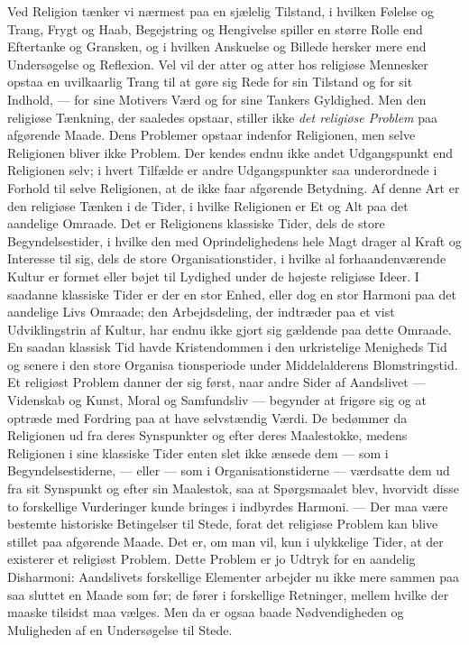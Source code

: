 \documentclass[12pt,a4paper,openany]{book}
\newcommand{\opage}[1]{\marginnote{\footnotesize\textit{[#1]}}}
\begin{document}
Ved Religion tænker vi nærmest paa en sjælelig Tilstand, i hvilken
Følelse og Trang, Frygt og Haab, Begejstring og Hengivelse spiller en
større Rolle end Eftertanke og Gransken, og i hvilken Anskuelse og
Billede hersker mere end Undersøgelse og Reflexion. Vel vil der atter og
atter hos religiøse Mennesker opstaa en uvilkaarlig Trang til at gøre
sig Rede for sin Tilstand og for sit Indhold, --- for sine Motivers Værd
og for sine Tankers Gyldighed. Men den religiøse Tænkning, der saaledes
opstaar, stiller ikke \textit{det religiøse Problem} paa afgørende
Maade. Dens Problemer opstaar indenfor Religionen, men selve Religionen
bliver ikke Problem. Der kendes endnu ikke andet Udgangspunkt end
Religionen selv; i hvert Tilfælde er andre Udgangspunkter saa
underordnede i Forhold til selve Religionen, at de ikke faar afgørende
Betydning. Af denne Art er den religiøse Tænken i de Tider, i hvilke
Religionen er Et og Alt paa det aandelige Omraade. Det er Religionens
klassiske Tider, dels de store Begyndelsestider, i hvilke den med
Oprindelighedens hele Magt drager al Kraft og Interesse til sig, dels de
store Organisationstider, i hvilke al forhaandenværende Kultur er formet
eller bøjet til Lydighed under de højeste religiøse Ideer. I saadanne
klassiske Tider er der en stor Enhed, eller dog en stor Harmoni paa det
aandelige Livs Omraade; den Arbejdsdeling, der indtræder paa et vist
Udviklingstrin af Kultur, har endnu ikke gjort sig gældende paa dette
Omraade. En saadan klassisk Tid havde Kristendommen i den urkristelige
Menigheds Tid og senere i den store Organisa%
\opage{4}tionsperiode under Middelalderens Blomstringstid. Et religiøst
Problem danner der sig først, naar andre Sider af Aandslivet ---
Videnskab og Kunst, Moral og Samfundsliv --- begynder at frigøre sig og
at optræde med Fordring paa at have selvstændig Værdi. De bedømmer da
Religionen ud fra deres Synspunkter og efter deres Maalestokke, medens
Religionen i sine klassiske Tider enten slet ikke ænsede dem --- som i
Begyndelsestiderne, --- eller --- som i Organisationstiderne ---
værdsatte dem ud fra sit Synspunkt og efter sin Maalestok, saa at
Spørgsmaalet blev, hvorvidt disse to forskellige Vurderinger kunde
bringes i indbyrdes Harmoni. --- Der maa være bestemte historiske
Betingelser til Stede, forat det religiøse Problem kan blive stillet paa
afgørende Maade. Det er, om man vil, kun i ulykkelige Tider, at der
existerer et religiøst Problem. Dette Problem er jo Udtryk for en
aandelig Disharmoni: Aandslivets forskellige Elementer arbejder nu ikke
mere sammen paa saa sluttet en Maade som før; de fører i forskellige
Retninger, mellem hvilke der maaske tilsidst maa vælges. Men da er ogsaa
baade Nødvendigheden og Muligheden af en Undersøgelse til Stede.
\end{document}
